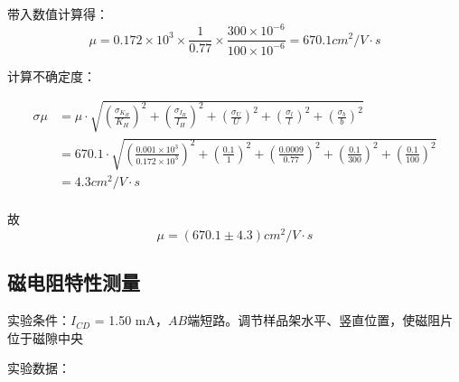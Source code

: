 \documentclass[UTF8]{ctexart}
\begin{document}
带入数值计算得：$$\mu=0.172\times10^{3}\times\frac{1}{0.77}\times\frac{300\times10^{-6}}{100\times10^{-6}}=670.1cm^2/V\cdot s$$

计算不确定度：

\begin{equation}
    \begin{aligned}
        \sigma{\mu}
        & = \mu\cdot\sqrt{\left(\frac{\sigma_{K_H}}{K_H}\right)^2+\left(\frac{\sigma_{I_H}}{I_H}\right)^2+\left(\frac{\sigma_{U}}{U}\right)^2+\left(\frac{\sigma_{l}}{l}\right)^2+\left(\frac{\sigma_{b}}{b}\right)^2}\\
        & = 670.1\cdot\sqrt{\left(\frac{0.001\times10^{3}}{0.172\times10^{3}}\right)^2+\left(\frac{0.1}{1}\right)^2+\left(\frac{0.0009}{0.77}\right)^2+\left(\frac{0.1}{300}\right)^2+\left(\frac{0.1}{100}\right)^2}\\
        & = 4.3cm^2/V\cdot s\\
    \end{aligned}
\end{equation}

故$$\mu=(670.1\pm4.3)cm^2/V\cdot s$$

\subsection{磁电阻特性测量}

实验条件：$I_{CD}$ = 1.50 mA，$AB$端短路。调节样品架水平、竖直位置，使磁阻片位于磁隙中央

实验数据：
\end{document}
